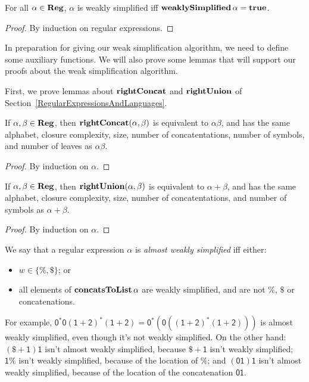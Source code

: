 \begin{proposition}
For all $\alpha\in\mathbf{Reg}$, $\alpha$ is weakly simplified iff
$\mathbf{weaklySimplified}\,\alpha = \mathbf{true}$.
\end{proposition}

\begin{proof}
By induction on regular expressions.
\end{proof}

In preparation for giving our weak simplification algorithm, we need
to define some auxiliary functions. We will also prove some lemmas
that will support our proofs about the weak simplification algorithm.

First, we prove lemmas about $\mathbf{rightConcat}$ and $\mathbf{rightUnion}$ of
Section~\ref{RegularExpressionsAndLanguages}.

\begin{lemma}
\label{RightConcatLem}
If $\alpha,\beta\in\mathbf{Reg}$, then $\mathbf{rightConcat}(\alpha,\beta)$ is
equivalent to $\alpha\beta$, and has the same alphabet, closure
complexity, size, number of concatentations, number of symbols, and
number of leaves as $\alpha\beta$.
\end{lemma}

\begin{proof}
By induction on $\alpha$.
\end{proof}

\begin{lemma}
\label{RightUnionLem}
If $\alpha,\beta\in\mathbf{Reg}$, then $\mathbf{rightUnion}(\alpha,\beta)$ is
equivalent to $\alpha+\beta$, and has the same alphabet, closure
complexity, size, number of concatentations, and number of symbols as
$\alpha+\beta$.
\end{lemma}

\begin{proof}
By induction on $\alpha$.
\end{proof}

We say that a regular expression
$\alpha$ is \emph{almost weakly simplified} iff either:
\begin{itemize}
\item $w\in\{\%,\$\}$; or

\item all elements of $\mathbf{concatsToList}\,\alpha$ are weakly simplified,
  and are not $\%$, $\$$ or concatenations.
\end{itemize}

For example, $\mathsf{0^*0(1+2)^*(1+2)} =
\mathsf{0^*(0((1+2)^*(1+2)))}$ is almost weakly simplified, even
though it's not weakly simplified.  On the other hand:
$\mathsf{(\$+1)1}$ isn't almost weakly simplified, because
$\mathsf{\$+1}$ isn't weakly simplified; $\mathsf{1\%}$ isn't weakly
simplified, because of the location of $\%$; and $\mathsf{(01)1}$
isn't almost weakly simplified, because of the location of the
concatenation $\mathsf{01}$.

